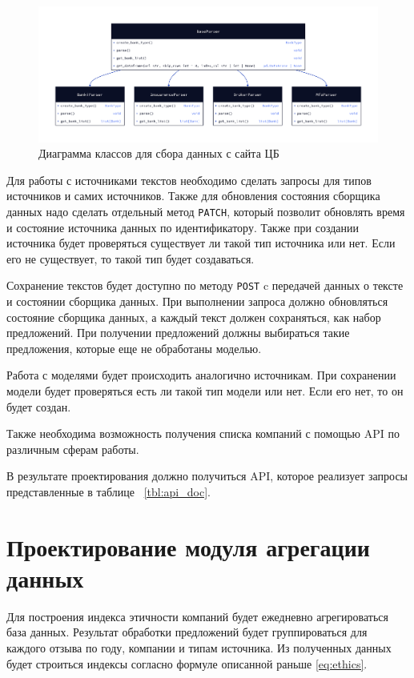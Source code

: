 \documentclass[PI, VKR]{HSEUniversity}
\begin{document}
\begin{figure}[h!]
\centering
\includegraphics[width=\textwidth]{img/d2/cbr_parser_class.png}
\caption{\label{fig:cbr_parser_class}Диаграмма классов для сбора данных с сайта ЦБ}
\end{figure}

Для работы с источниками текстов необходимо сделать запросы для типов источников и самих источников. Также для обновления состояния сборщика данных надо сделать отдельный метод \texttt{PATCH}, который позволит обновлять время и состояние источника данных по идентификатору. Также при создании источника будет проверяться существует ли такой тип источника или нет. Если его не существует, то такой тип будет создаваться.

Сохранение текстов будет доступно по методу \texttt{POST} c передачей данных о тексте и состоянии сборщика данных. При выполнении запроса должно обновляться состояние сборщика данных, а каждый текст должен сохраняться, как набор предложений. При получении предложений должны выбираться такие предложения, которые еще не обработаны моделью.

Работа с моделями будет происходить аналогично источникам. При сохранении модели будет проверяться есть ли такой тип модели или нет. Если его нет, то он будет создан.

Также необходима возможность получения списка компаний с помощью API по различным сферам работы.

В результате проектирования должно получиться API, которое реализует запросы представленные в таблице ~\ref{tbl:api_doc}.
\section{Проектирование модуля агрегации данных}
\label{sec:orgabc7c5e}
Для построения индекса этичности компаний будет ежедневно агрегироваться база данных. Результат обработки предложений будет группироваться для каждого отзыва по году, компании и типам источника. Из полученных данных будет строиться индексы согласно формуле описанной раньше \ref{eq:ethics}.
\end{document}
